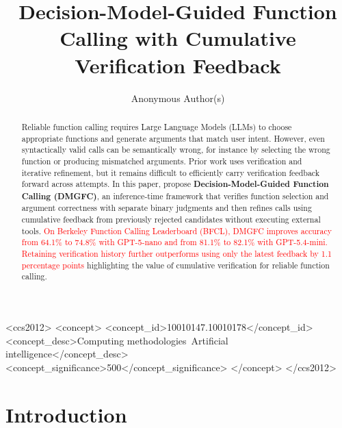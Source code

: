 \documentclass[sigconf,anonymous,review]{acmart}
\begin{document}
\title{Decision-Model-Guided Function Calling with Cumulative Verification Feedback}

\author{Anonymous Author(s)}

\begin{abstract}


Reliable function calling requires Large Language Models (LLMs) to choose appropriate functions and generate arguments that match user intent. However, even syntactically valid calls can be semantically wrong, for instance by selecting the wrong function or producing mismatched arguments. Prior work uses verification and iterative refinement, but it remains difficult to efficiently carry verification feedback forward across attempts. In this paper, propose \textbf{Decision-Model-Guided Function Calling (DMGFC)}, an inference-time framework that verifies function selection and argument correctness with separate binary judgments and then refines calls using cumulative feedback from previously rejected candidates without executing external tools. \textcolor{red}{On Berkeley Function Calling Leaderboard (BFCL), DMGFC improves accuracy from 64.1\% to 74.8\% with GPT-5-nano and from 81.1\% to 82.1\% with GPT-5.4-mini. Retaining verification history further outperforms using only the latest feedback by 1.1 percentage points} highlighting the value of cumulative verification for reliable function calling.
\end{abstract}

\begin{CCSXML}
<ccs2012>
 <concept>
  <concept_id>10010147.10010178</concept_id>
  <concept_desc>Computing methodologies~Artificial intelligence</concept_desc>
  <concept_significance>500</concept_significance>
 </concept>
</ccs2012>
\end{CCSXML}




\maketitle
\raggedbottom



\section{Introduction}

\end{document}
